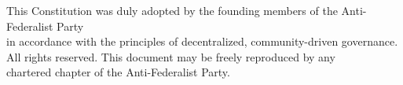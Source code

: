 \documentclass[11pt, letterpaper]{article}
\begin{document}

\thispagestyle{fancy}

\vspace*{2cm}


\vspace{3cm}




\vspace{2cm}

\begin{center}
  {\small\color{afp-gray}\sffamily
    This Constitution was duly adopted by the founding members of the Anti-Federalist Party\\
    in accordance with the principles of decentralized, community-driven governance.\\[1em]
    All rights reserved. This document may be freely reproduced by any\\
    chartered chapter of the Anti-Federalist Party.
  }
\end{center}
\end{document}
